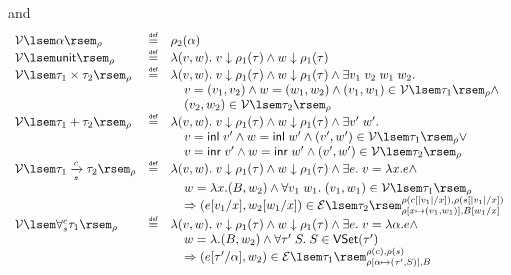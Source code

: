 \documentclass[preprint]{sigplanconf}
\newcommand{\arrow}[4]{#1\xrightarrow[#3]{#2}#4}
\newcommand{\syminl}{\mathsf{inl}}
\newcommand{\syminr}{\mathsf{inr}}
\newcommand{\symunit}{\mathsf{unit}}
\newcommand{\relV}[1]{\mathcal{V}\lsem#1\rsem}
\newcommand{\relE}[1]{\mathcal{E}\lsem#1\rsem}
\newcommand\defeq{\mathrel{\overset{\makebox[0pt]{\mbox{\normalfont\tiny\sffamily def}}}{=}}}
\begin{document}
\begin{figure}
\fbox{$\relV{\tau}$} and \fbox{$\relE{\tau}$}
$$
\begin{array}{lcl}
  \relV{\alpha}_\rho &\defeq& \rho_2(\alpha) \\
  \relV{\symunit}_\rho &\defeq& \lambda(v,w).\; v \downarrow \rho_1(\tau) \wedge w \downarrow \rho_1(\tau) \\
  \relV{\tau_1\times\tau_2}_\rho &\defeq& \lambda(v,w).\; v \downarrow \rho_1(\tau) \wedge w \downarrow \rho_1(\tau) \wedge \exists v_1\;v_2\;w_1\;w_2. \\
  & & \hspace{.15in} v=(v_1,v_2) \wedge w=(w_1,w_2) \wedge (v_1,w_1) \in \relV{\tau_1}_\rho \wedge \\
  & & \hspace{.15in} (v_2,w_2) \in \relV{\tau_2}_\rho \\
  \relV{\tau_1+\tau_2}_\rho &\defeq& \lambda(v,w).\; v \downarrow \rho_1(\tau) \wedge w \downarrow \rho_1(\tau) \wedge \exists v'\;w'. \\
  & & \hspace{.15in} v=\syminl\;v' \wedge w=\syminl\;w' \wedge (v',w') \in \relV{\tau_1}_\rho \vee \\
  & & \hspace{.15in} v=\syminr\;v' \wedge w=\syminr\;w' \wedge (v',w') \in \relV{\tau_2}_\rho \\
  \relV{\arrow{\tau_1}{c}{s}{\tau_2}}_\rho &\defeq& \lambda (v,w).\;v \downarrow \rho_1(\tau) \wedge w \downarrow \rho_1(\tau) \wedge \exists e.\;v=\lambda x.e \wedge \\
  & & \hspace{.15in} w=\lambda x.(B,w_2) \wedge \forall v_1\;w_1.\;(v_1,w_1) \in \relV{\tau_1}_\rho \\
  & & \hspace{.15in} \Rightarrow (e[v_1/x], w_2[w_1/x])\in \relE{\tau_2}^{\rho(c[|v_1|/x]),\rho(s[|v_1|/x])}_{\rho[x\mapsto(v_1,w_1)],B[w_1/x]} \\
  \relV{\forall^c_s\tau_1}_\rho &\defeq& \lambda (v,w).\;v \downarrow \rho_1(\tau) \wedge w \downarrow \rho_1(\tau) \wedge \exists e.\;v=\lambda\alpha.e \wedge \\
  & & \hspace{.15in} w=\lambda.(B,w_2) \wedge \forall \tau'\;S.\;S \in \mathsf{VSet}(\tau') \\
  & & \hspace{.15in} \Rightarrow (e[\tau'/\alpha], w_2)\in \relE{\tau_1}^{\rho(c),\rho(s)}_{\rho[\alpha\mapsto(\tau',S)],B} \\

\end{array}$$
\end{figure}
\end{document}
